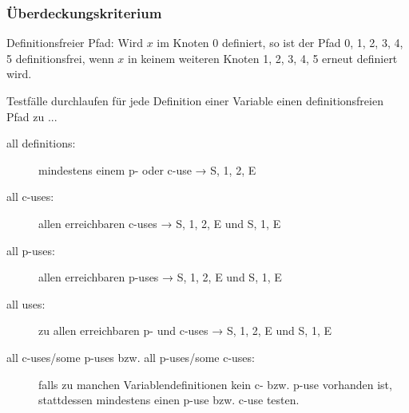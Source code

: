 \documentclass{lehramt-informatik-haupt}
\begin{document}

%

\subsubsection{Überdeckungskriterium}

Definitionsfreier Pfad: Wird $x$ im Knoten $0$ definiert, so ist der
Pfad 0, 1, 2, 3, 4, 5 definitionsfrei, wenn $x$ in keinem weiteren
Knoten 1, 2, 3, 4, 5 erneut definiert wird.

\bigskip\noindent
Testfälle durchlaufen für jede Definition einer Variable einen
definitionsfreien Pfad zu ...

\begin{description}

\item[all definitions:] mindestens einem p- oder c-use
→ S, 1, 2, E

\item[all c-uses:] allen erreichbaren c-uses
→ S, 1, 2, E und S, 1, E

\item[all p-uses:] allen erreichbaren p-uses
→ S, 1, 2, E und S, 1, E

\item[all uses:] zu allen erreichbaren p- und c-uses
→ S, 1, 2, E und S, 1, E

\item[all c-uses/some p-uses bzw. all p-uses/some c-uses:] falls zu
manchen Variablendefinitionen kein c- bzw. p-use vorhanden ist,
stattdessen mindestens einen p-use bzw. c-use testen.
\end{description}
\end{document}
